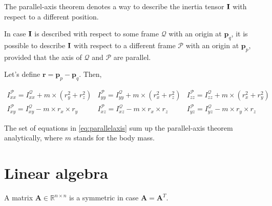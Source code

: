 The parallel-axis theorem \cite{Beer2015} denotes a way to describe the inertia tensor $\mathbf{I}$ with respect to a different position. 

In case $\mathbf{I}$ is described with respect to some frame $\mathcal{Q}$ with an origin at $\mathbf{p}_q$, it is possible to describe $\mathbf{I}$ with respect to a different frame $\mathcal{P}$ with an origin at $\mathbf{p}_p$, provided that the axis of $\mathcal{Q}$ and $\mathcal{P}$ are parallel.

Let's define $\mathbf{r} = \mathbf{p}_p - \mathbf{p}_q$. Then, 

\begin{equation}
	\begin{matrix}
    	I_{xx}^{\mathcal{P}} = I_{xx}^{\mathcal{Q}} + m \times (r_y^2 + r_z^2)  & I_{yy}^{\mathcal{P}} = I_{yy}^{\mathcal{Q}} + m \times (r_x^2 + r_z^2) & I_{zz}^{\mathcal{P}} = I_{zz}^{\mathcal{Q}} + m \times (r_x^2 + r_y^2) \\
    I_{xy}^{\mathcal{P}} = I_{xy}^{\mathcal{Q}} - m \times r_x \times r_y & I_{xz}^{\mathcal{P}} = I_{xz}^{\mathcal{Q}} - m \times r_x \times r_z & I_{yz}^{\mathcal{P}} = I_{yz}^{\mathcal{Q}} - m \times r_y \times r_z
	\end{matrix}
	\label{eq:parallelaxis}
\end{equation}

The set of equations in \ref{eq:parallelaxis} sum up the parallel-axis theorem analytically, where $m$ stands for the body mass.

\section{Linear algebra}
\label{section:linalgebra}

\begin{definition}
A matrix $\mathbf{A} \in \mathbb{R}^{n \times n}$ is a symmetric in case $\mathbf{A} = \mathbf{A}^T$.
\end{definition}

